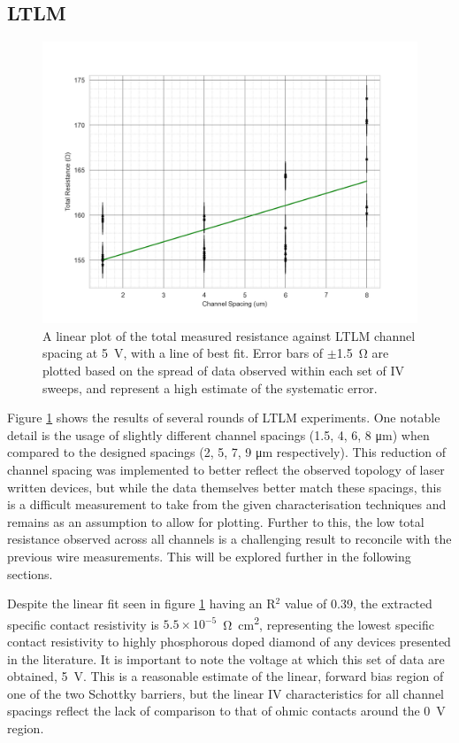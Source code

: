 \begin{refsection}
\subsection{LTLM}
\begin{figure}[H]
    \centering
    \includegraphics[width=\linewidth]{Chapter7/Figs/Raster/LTLM_graphite_mid(5.0V).png}
    \caption{A linear plot of the total measured resistance against LTLM channel spacing at 5~\si{\volt}, with a line of best fit. Error bars of $\pm$1.5~\si{\ohm} are plotted based on the spread of data observed within each set of IV sweeps, and represent a high estimate of the systematic error.}
    \label{fig:ltlm_graphite_5v_mid}
\end{figure}

Figure \ref{fig:ltlm_graphite_5v_mid} shows the results of several rounds of LTLM experiments. One notable detail is the usage of slightly different channel spacings (1.5, 4, 6, 8 \si{\micro\metre}) when compared to the designed spacings (2, 5, 7, 9 \si{\micro\metre} respectively). This reduction of channel spacing was implemented to better reflect the observed topology of laser written devices, but while the data themselves better match these spacings, this is a difficult measurement to take from the given characterisation techniques and remains as an assumption to allow for plotting. Further to this, the low total resistance observed across all channels is a challenging result to reconcile with the previous wire measurements. This will be explored further in the following sections.

Despite the linear fit seen in figure \ref{fig:ltlm_graphite_5v_mid} having an R$^{2}$ value of 0.39, the extracted specific contact resistivity is $5.5\times10^{-5}$~\si{\ohm\centi\metre\squared}, representing the lowest specific contact resistivity to highly phosphorous doped diamond of any devices presented in the literature. It is important to note the voltage at which this set of data are obtained, 5~\si{\volt}. This is a reasonable estimate of the linear, forward bias region of one of the two Schottky barriers, but the linear IV characteristics for all channel spacings reflect the lack of comparison to that of ohmic contacts around the 0~\si{\volt} region. 


\end{refsection}
